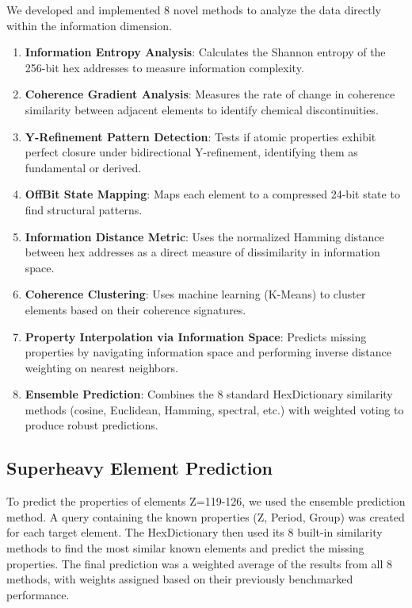 \documentclass[12pt, a4paper]{article}
\begin{document}
We developed and implemented 8 novel methods to analyze the data directly within the information dimension.

\begin{enumerate}
    \item \textbf{Information Entropy Analysis}: Calculates the Shannon entropy of the 256-bit hex addresses to measure information complexity.
    \item \textbf{Coherence Gradient Analysis}: Measures the rate of change in coherence similarity between adjacent elements to identify chemical discontinuities.
    \item \textbf{Y-Refinement Pattern Detection}: Tests if atomic properties exhibit perfect closure under bidirectional Y-refinement, identifying them as fundamental or derived.
    \item \textbf{OffBit State Mapping}: Maps each element to a compressed 24-bit state to find structural patterns.
    \item \textbf{Information Distance Metric}: Uses the normalized Hamming distance between hex addresses as a direct measure of dissimilarity in information space.
    \item \textbf{Coherence Clustering}: Uses machine learning (K-Means) to cluster elements based on their coherence signatures.
    \item \textbf{Property Interpolation via Information Space}: Predicts missing properties by navigating information space and performing inverse distance weighting on nearest neighbors.
    \item \textbf{Ensemble Prediction}: Combines the 8 standard HexDictionary similarity methods (cosine, Euclidean, Hamming, spectral, etc.) with weighted voting to produce robust predictions.
\end{enumerate}

\subsection{Superheavy Element Prediction}

To predict the properties of elements Z=119-126, we used the ensemble prediction method. A query containing the known properties (Z, Period, Group) was created for each target element. The HexDictionary then used its 8 built-in similarity methods to find the most similar known elements and predict the missing properties. The final prediction was a weighted average of the results from all 8 methods, with weights assigned based on their previously benchmarked performance.
\end{document}
